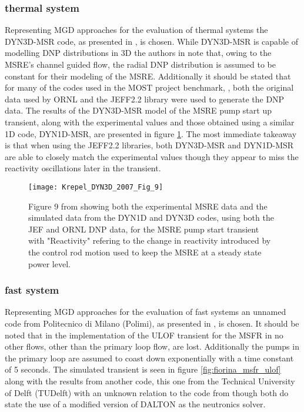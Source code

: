 \documentclass[review]{elsarticle}
\begin{document}
\subsubsection{thermal system} \label{sssec:mgd_ts}
Representing MGD approaches for the evaluation of thermal systems the DYN3D-MSR
code, as presented in \cite{krepel_dyn3d-msr_2007}, is chosen. While DYN3D-MSR is
capable of modelling DNP distributions in 3D the authors in
\cite{krepel_dyn3d-msr_2007} note that, owing to the MSRE's channel guided flow,
the radial DNP distribution is assumed to be constant for their modeling of the
MSRE. Additionally it should be stated that for many of the codes used in the
MOST project benchmark, \cite{delpech_benchmark_2003}, both the original data used
by ORNL and the JEFF2.2 library were used to generate the DNP data.
The results of the DYN3D-MSR model of the MSRE pump start up transient,
along with the experimental values and those obtained using a similar 1D code,
DYN1D-MSR, are presented in figure \ref{fig:krepel_dyn3d_msre_pump_start}. The most
immediate takeaway is that when using the JEFF2.2 libraries, both DYN3D-MSR and
DYN1D-MSR are able to closely match the experimental values though they appear to
miss the reactivity oscillations later in the transient.

\begin{figure}[h]
   \centering
   \texttt{[image: Krepel\_DYN3D\_2007\_Fig\_9]}
   \caption{Figure 9 from \cite{krepel_dyn3d-msr_2007} showing both the experimental MSRE data
   and the simulated data from the DYN1D and DYN3D codes, using both the JEF and ORNL DNP data, for
   the MSRE pump start transient with "Reactivity" refering to the change in reactivity introduced
   by the control rod motion used to keep the MSRE at a steady state power level.} 
   \label{fig:krepel_dyn3d_msre_pump_start}
\end{figure}

\subsubsection{fast system} \label{sssec:mgd_fs}
Representing MGD approaches for the evaluation of fast systems an unnamed code
from Politecnico di Milano (Polimi), as presented in \cite{fiorina_modelling_2014}, is
chosen. It should be noted that in the implementation of the ULOF transient for
the MSFR in \cite{fiorina_modelling_2014} no other flows, other than the primary
loop flow, are lost. Additionally the pumps in the primary loop are assumed to
coast down exponentially with a time constant of 5 seconds. The simulated transient is
seen in figure \ref{fig:fiorina_msfr_ulof} along with the results from another
code, this one from the Technical University of Delft (TUDelft) with an unknown relation to
the code from \cite{kophazi_development_2009} though both do state the use of a
modified version of DALTON as the neutronics solver. 
\end{document}
